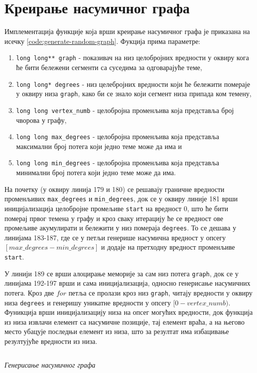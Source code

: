 \section{Креирање насумичног графа}
Имплементација функције која врши креирање насумичног графа је приказана на исечку \ref{code:generate-random-graph}. Фукција  прима параметре:
\begin{enumerate}
    \item \texttt{long long** graph} - показивач на низ целобројних вредности у оквиру кога ће бити бележени сегменти са суседима за одговарајуће теме,
    \item \texttt{long long* degrees} - низ целебројних вредности који ће бележити помераје у оквиру низа \texttt{graph}, како би се знало који сегмент низа припада ком темену,
    \item \texttt{long long vertex_numb} - целобројна променљива која представља број чворова у графу,
    \item \texttt{long long max_degrees} - целобројна променљива која представља максимални број потега који једно теме може да има и
    \item \texttt{long long min_degrees} - целобројна променљива која представља минимални број потега који једно теме може да има.
\end{enumerate}
На почетку (у оквиру линија 179 и 180) се решавају граничне вредности променљивих \texttt{max_degrees} и \texttt{min_degrees}, док се у оквиру линије 181 врши иницијализација целобројне промељиве \texttt{start} на вредност 0, што ће бити померај првог темена у графу и кроз сваку итерацију ће се вредност ове промељиве акумулирати и бележити у низ помераја \texttt{degrees}. То се дешава у линијама 183-187, где се у петљи генерише насумична вредност у опсегу $[max\_degrees-min\_degrees]$ и додаје на претходну вредност променљиве \texttt{start}.

\par
У линији 189 се врши алоцирање меморије за сам низ потега \texttt{graph}, док се у линијама 192-197 врши и сама иницијализација, односно генерисање насумичних потега. Кроз две $for$ петља се пролази кроз низ \texttt{graph}, читају вредности у оквиру низа \texttt{degrees} и генеришу уникатне вредности у опсегу $[0-vertex\_numb)$. Фуникција  врши иницијализацију низа на опсег могућих вредности, док функција  из низа извлачи елемент са насумичне позиције, тај елемент враћа, а на његово место убацује последњи елемент из низа, што за резултат има избацивање резултујуће вредности из низа.

\begin{listing}[H]
\inputminted[fontsize={\fontsize{7}{6}\selectfont},firstline=160,lastline=202]{c}{kodovi/bfs-dist-general-1d.c}
\caption{\textit{Генерисање насумичног графа}}
\label{code:generate-random-graph}
\end{listing}